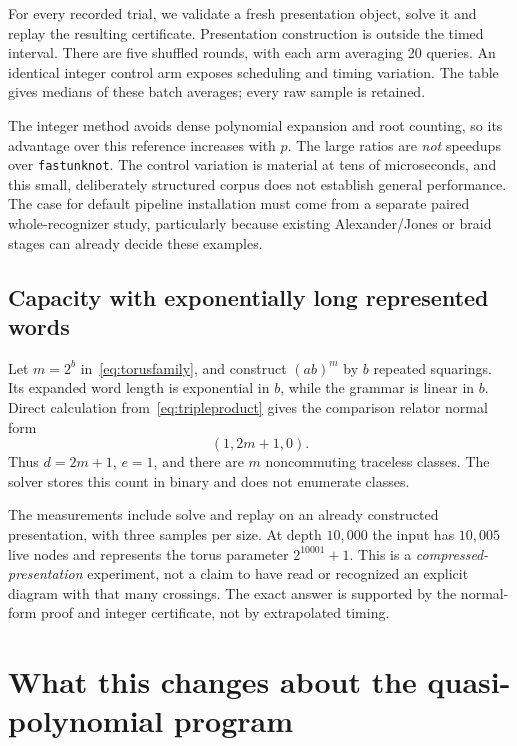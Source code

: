\documentclass[11pt]{article}
\theoremstyle{definition}
\theoremstyle{remark}
\newcommand{\code}[1]{\texttt{#1}}
\begin{document}
For every recorded trial, we validate a fresh presentation object, solve it and replay the resulting certificate. Presentation construction is outside the timed interval. There are five shuffled rounds, with each arm averaging 20 queries. An identical integer control arm exposes scheduling and timing variation. The table gives medians of these batch averages; every raw sample is retained.

\begin{center}\small

\end{center}

The integer method avoids dense polynomial expansion and root counting, so its advantage over this reference increases with $p$. The large ratios are \emph{not} speedups over \code{fastunknot}. The control variation is material at tens of microseconds, and this small, deliberately structured corpus does not establish general performance. The case for default pipeline installation must come from a separate paired whole-recognizer study, particularly because existing Alexander/Jones or braid stages can already decide these examples.

\subsection{Capacity with exponentially long represented words}
Let $m=2^b$ in~\eqref{eq:torusfamily}, and construct $(ab)^m$ by $b$ repeated squarings. Its expanded word length is exponential in $b$, while the grammar is linear in $b$. Direct calculation from~\eqref{eq:tripleproduct} gives the comparison relator normal form
\[
(1,2m+1,0).
\]
Thus $d=2m+1$, $e=1$, and there are $m$ noncommuting traceless classes. The solver stores this count in binary and does not enumerate classes.

\begin{center}\small

\end{center}
The measurements include solve and replay on an already constructed presentation, with three samples per size. At depth $10{,}000$ the input has $10{,}005$ live nodes and represents the torus parameter $2^{10001}+1$. This is a \emph{compressed-presentation} experiment, not a claim to have read or recognized an explicit diagram with that many crossings. The exact answer is supported by the normal-form proof and integer certificate, not by extrapolated timing.

\section{What this changes about the quasi-polynomial program}
\label{sec:program}
\end{document}

